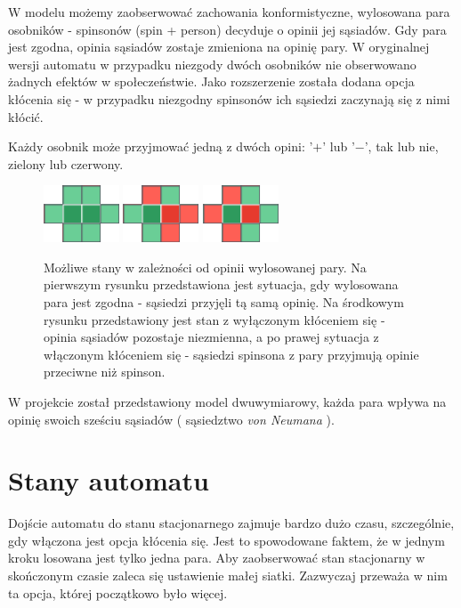 \documentclass[12pt]{article}
\begin{document}
W modelu możemy zaobserwować zachowania konformistyczne, wylosowana para osobników - spinsonów (spin + person) decyduje o opinii jej sąsiadów. Gdy para jest zgodna, opinia sąsiadów zostaje zmieniona na opinię pary. W oryginalnej wersji automatu w przypadku niezgody dwóch osobników nie obserwowano żadnych efektów w społeczeństwie. Jako rozszerzenie została dodana opcja kłócenia się - w przypadku niezgodny spinsonów ich sąsiedzi zaczynają się z nimi kłócić.

Każdy osobnik może przyjmować jedną z dwóch opini: '$+$' lub '$-$', tak lub nie, zielony lub czerwony.

\begin{figure}[H]
\centering
\includegraphics[width=0.2\textwidth]{zgoda.png} \qquad
\includegraphics[width=0.2\textwidth]{nic.png} \qquad
\includegraphics[width=0.2\textwidth]{klocenie.png}
\caption{Możliwe stany w zależności od opinii wylosowanej pary. Na pierwszym rysunku przedstawiona jest sytuacja, gdy wylosowana para jest zgodna - sąsiedzi przyjęli tą samą opinię. Na środkowym rysunku przedstawiony jest stan z wyłączonym kłóceniem się - opinia sąsiadów pozostaje niezmienna, a po prawej sytuacja z włączonym kłóceniem się - sąsiedzi spinsona z pary przyjmują opinie przeciwne niż spinson.}
\end{figure}

W projekcie został przedstawiony model dwuwymiarowy, każda para wpływa na opinię swoich sześciu sąsiadów ( sąsiedztwo \textit{von Neumana} ).


\section{Stany automatu}
Dojście automatu do stanu stacjonarnego zajmuje bardzo dużo czasu, szczególnie, gdy włączona jest opcja kłócenia się. Jest to spowodowane faktem, że w jednym kroku losowana jest tylko jedna para. Aby zaobserwować stan stacjonarny w skończonym czasie zaleca się ustawienie małej siatki. Zazwyczaj przeważa w nim ta opcja, której początkowo było więcej.
\end{document}
